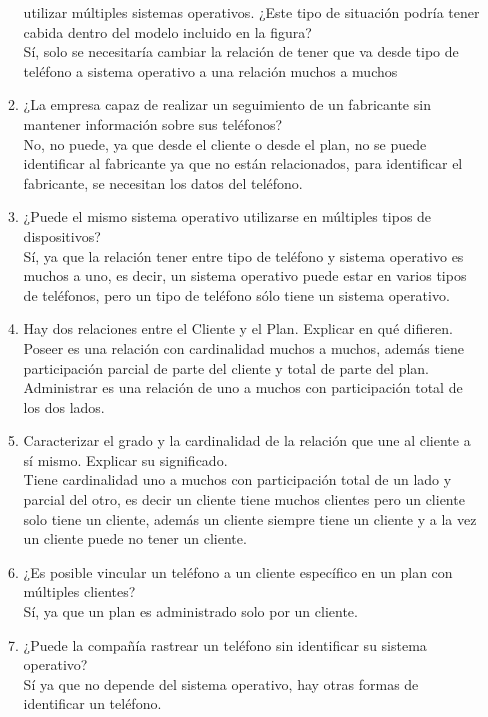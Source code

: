 \documentclass[a4paper, 12pt]{report}
\begin{document}
\begin{enumerate}
\begin{enumerate}
			utilizar múltiples sistemas operativos. ¿Este tipo de
			situación podría tener cabida dentro del modelo incluido
			en la figura?\\
			Sí, solo se necesitaría cambiar la relación de tener que va
			desde tipo de teléfono a sistema operativo a una relación
			muchos a muchos
			\item ¿La empresa capaz de realizar un seguimiento de un
			fabricante sin mantener información sobre sus teléfonos?\\
			No, no puede, ya que desde el cliente o desde el plan,
			no se puede identificar al fabricante ya que no están
			relacionados, para identificar el fabricante, se necesitan
			los datos del teléfono.
			\item ¿Puede el mismo sistema operativo utilizarse en
			múltiples tipos de dispositivos?\\
			Sí, ya que la relación tener entre tipo de teléfono y
			sistema operativo es muchos a uno, es decir, un sistema
			operativo puede estar en varios tipos de teléfonos, pero
			un tipo de teléfono sólo tiene un sistema operativo.
			\item Hay dos relaciones entre el Cliente y el Plan. Explicar en qué difieren.\\
			Poseer es una relación con cardinalidad muchos a muchos,
			además tiene participación parcial de parte del cliente y
			total de parte del plan.\\
			Administrar es una relación de uno a muchos con
			participación total de los dos lados.
			\item Caracterizar el grado y la cardinalidad de la
			relación que une al cliente a sí mismo. Explicar su
			significado.\\
			Tiene cardinalidad uno a muchos con participación total de
			un lado y parcial del otro, es decir un cliente tiene muchos clientes pero un cliente solo tiene un cliente,
			además un cliente siempre tiene un cliente y a la vez un
			cliente puede no tener un cliente.
			\item ¿Es posible vincular un teléfono a un cliente
			específico en un plan con múltiples clientes?\\
			Sí, ya que un plan es administrado solo por un cliente.
			\item ¿Puede la compañía rastrear un teléfono sin identificar su sistema operativo?\\
			Sí ya que no depende del sistema operativo, hay otras
			formas de identificar un teléfono.

		\end{enumerate}

	\end{enumerate}
\end{document}
